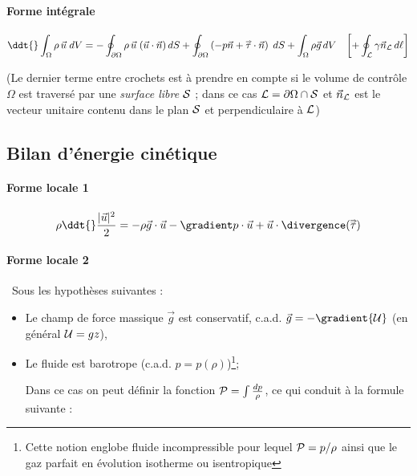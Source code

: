 \paragraph{Forme intégrale}
	\begin{equation}
		\ddt{} \int_{\Omega} \rho \, \vec{u} \; dV 
		=
		- \oint_{\partial \Omega} \rho \, \vec{u}\; (\vec{u}\cdot \vec{n}) \, dS
		+ \oint_{\partial \Omega} \left( -p \vec{n} + \mytensor{\tau} \cdot \vec{n}\right) \; dS
		+ \int_{\Omega} \rho \vec{g} \, dV 
		\quad { \left[ + \oint_{\cal L} \gamma \vec{n}_{\cal L}  \, d\ell \right]}
		\label{eq:bilan_global_eulerien_qdm}
	\end{equation}
	
{\small (Le dernier terme entre crochets est à prendre en compte si le volume de contrôle $\Omega$ est traversé par une {\em surface libre} ${\cal S}$ ; dans ce cas  $ {\cal L} = {\partial \Omega} \cap \cal S$ et $\vec{n}_{\cal L} $ est le vecteur unitaire contenu dans le plan ${\cal S}$ et perpendiculaire à ${\cal L}$)}

\subsection{Bilan d'énergie cinétique}


\paragraph{Forme locale 1}
\begin{equation}
		\rho \ddt{} \frac{ |\vec{u}|^2}{2} 
		= 
		- \rho \vec{g} \cdot \vec{u}  - \gradient p \cdot {\vec u} + \vec{u} \cdot \divergence ( \mytensor{\tau} )
\end{equation}

\paragraph{Forme locale 2}

$\,$
Sous les hypothèses suivantes :
\begin{itemize}
\item 
Le champ de force massique $\vec g$ est conservatif, c.a.d. 
$\vec g = -\gradient {\cal U}$ (en général ${\cal U}= g z$),
\item  Le fluide est barotrope (c.a.d. $p=p(\rho)$)\footnote{Cette notion englobe fluide incompressible pour lequel ${\cal P} = p/ \rho$  ainsi que le gaz parfait en évolution isotherme ou isentropique};

Dans ce cas on peut définir la  fonction 
${\cal P} = \int \frac{d p}{\rho}$, ce qui conduit à la formule suivante :
\end{itemize}

